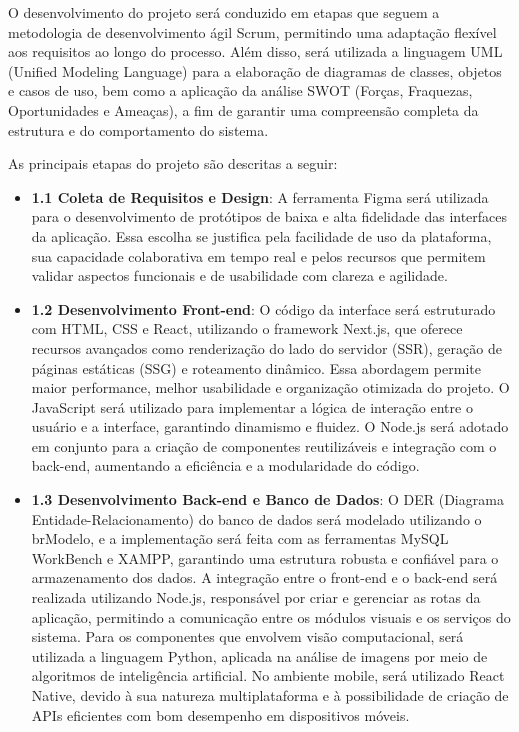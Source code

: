 O desenvolvimento do projeto será conduzido em etapas que seguem a metodologia de desenvolvimento ágil Scrum, permitindo uma adaptação flexível aos requisitos ao longo do processo. Além disso, será utilizada a linguagem UML (Unified Modeling Language) para a elaboração de diagramas de classes, objetos e casos de uso, bem como a aplicação da análise SWOT (Forças, Fraquezas, Oportunidades e Ameaças), a fim de garantir uma compreensão completa da estrutura e do comportamento do sistema.

As principais etapas do projeto são descritas a seguir:

\begin{itemize}
    \item \textbf{1.1 Coleta de Requisitos e Design}: A ferramenta Figma será utilizada para o desenvolvimento de protótipos de baixa e alta fidelidade das interfaces da aplicação. Essa escolha se justifica pela facilidade de uso da plataforma, sua capacidade colaborativa em tempo real e pelos recursos que permitem validar aspectos funcionais e de usabilidade com clareza e agilidade.
    \item \textbf{1.2 Desenvolvimento Front-end}: O código da interface será estruturado com HTML, CSS e React, utilizando o framework Next.js, que oferece recursos avançados como renderização do lado do servidor (SSR), geração de páginas estáticas (SSG) e roteamento dinâmico. Essa abordagem permite maior performance, melhor usabilidade e organização otimizada do projeto. O JavaScript será utilizado para implementar a lógica de interação entre o usuário e a interface, garantindo dinamismo e fluidez. O Node.js será adotado em conjunto para a criação de componentes reutilizáveis e integração com o back-end, aumentando a eficiência e a modularidade do código.
    \item \textbf{1.3 Desenvolvimento Back-end e Banco de Dados}: O DER (Diagrama Entidade-Relacionamento) do banco de dados será modelado utilizando o brModelo, e a implementação será feita com as ferramentas MySQL WorkBench e XAMPP, garantindo uma estrutura robusta e confiável para o armazenamento dos dados. A integração entre o front-end e o back-end será realizada utilizando Node.js, responsável por criar e gerenciar as rotas da aplicação, permitindo a comunicação entre os módulos visuais e os serviços do sistema. Para os componentes que envolvem visão computacional, será utilizada a linguagem Python, aplicada na análise de imagens por meio de algoritmos de inteligência artificial. No ambiente mobile, será utilizado React Native, devido à sua natureza multiplataforma e à possibilidade de criação de APIs eficientes com bom desempenho em dispositivos móveis.

\end{itemize}
